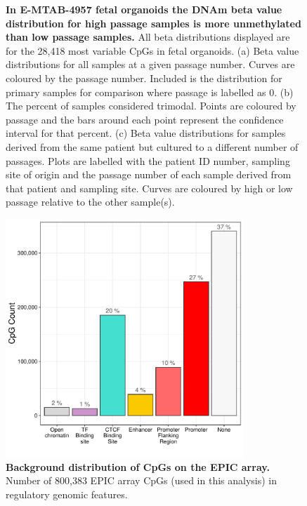 \documentclass[a4paper]{article}
\begin{document}
\begin{figure}
\begin{flushleft}
\caption{\textbf{In E-MTAB-4957 fetal organoids the DNAm beta value distribution for high passage samples is more unmethylated than low passage samples.} All beta distributions displayed are for the 28,418 most variable CpGs in fetal organoids. (a) Beta value distributions for all samples at a given passage number. Curves are coloured by the passage number. Included is the distribution for primary samples for comparison where passage is labelled as 0. (b) The percent of samples considered trimodal. Points are coloured by passage and the bars around each point represent the confidence interval for that percent. (c) Beta value distributions for samples derived from the same patient but cultured to a different number of passages. Plots are labelled with the patient ID number, sampling site of origin and the passage number of each sample derived from that patient and sampling site. Curves are coloured by high or low passage relative to the other sample(s).}
\label{fig:fetal}
\end{flushleft}
\end{figure}






\begin{figure}
\includegraphics[width=0.8\textwidth]{../figs/EPIC_distribution_reg_CpGs.pdf}
\caption{\textbf{Background distribution of CpGs on the EPIC array.} Number of 800,383 EPIC array CpGs (used in this analysis) in regulatory genomic features.}
\end{figure}
\end{document}
